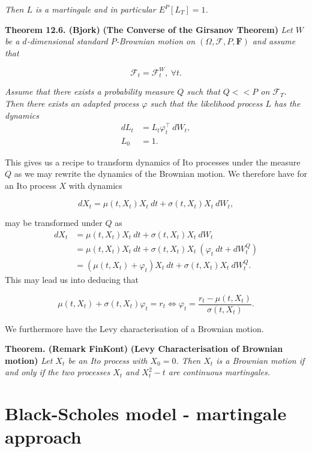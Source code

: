 \documentclass[a4paper,12pt,openany]{book}
\begin{document}
\emph{Then \(L\) is a martingale and in particular \(E^P[L_T]=1\).}

\textbf{Theorem 12.6. (Bjork)} \textbf{(The Converse of the Girsanov Theorem)} \emph{Let \(W\) be a \(d\)-dimensional standard \(P\)-Brownian motion on \((\Omega,\mathcal{F},P,\mathbf{F})\) and assume that}

\[
\mathcal{F}_t=\mathcal{F}^W_t,\ \forall t.
\]

\emph{Assume that there exists a probability measure \(Q\) such that \(Q<<P\) on \(\mathcal{F}_T\). Then there exists an adapted process \(\varphi\) such that the likelihood process \(L\) has the dynamics}
\begin{align*}
dL_t&=L_t\varphi^\top_t\ dW_t,\\
L_0&=1.
\end{align*}

This gives us a recipe to transform dynamics of Ito processes under the measure \(Q\) as we may rewrite the dynamics of the Brownian motion. We therefore have for an Ito process \(X\) with dynamics

\[
dX_t=\mu(t,X_t)X_t\ dt+\sigma(t,X_t) X_t\ dW_t,
\]

may be transformed under \(Q\) as
\begin{align*}
dX_t&=\mu(t,X_t)X_t\ dt+\sigma(t,X_t) X_t\ dW_t\\
&=\mu(t,X_t)X_t\ dt+\sigma(t,X_t) X_t\ (\varphi_t\ dt+dW_t^Q)\\
&=\left(\mu(t,X_t) + \varphi_t\right) X_t\ dt + \sigma(t,X_t)X_t\ dW_t^Q.
\end{align*}
This may lead us into deducing that

\[
\mu(t,X_t)+\sigma(t,X_t)\varphi_t=r_t\iff\varphi_t=\frac{r_t-\mu(t,X_t)}{\sigma(t,X_t)}.
\]

We furthermore have the Levy characterisation of a Brownian motion.

\textbf{Theorem. (Remark FinKont)} \textbf{(Levy Characterisation of Brownian motion)} \emph{Let \(X_t\) be an Ito process with \(X_0=0\). Then \(X_t\) is a Brownian motion if and only if the two processes \(X_t\) and \(X_t^2-t\) are continuous martingales.}

\hypertarget{black-scholes-model---martingale-approach}{%
\section{Black-Scholes model - martingale approach}\label{black-scholes-model---martingale-approach}}
\end{document}
